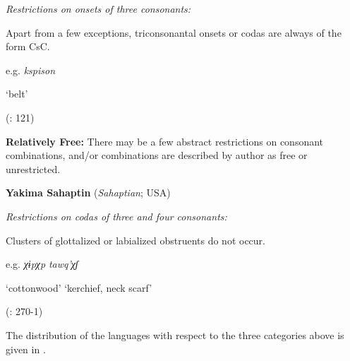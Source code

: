 \textit{Restrictions on onsets of three consonants:}

Apart from a few exceptions, triconsonantal onsets or codas are always of the form CsC.

e.g.  \textit{kspison}

    ‘belt’

(\citealt{LeSourd1993}: 121)
\z
\z

\ea\label{ex:3.29}
  \textbf{Relatively Free:} There may be a few abstract restrictions on consonant combinations, and/or combinations are described by author as free or unrestricted.


\ea
\textbf{Yakima Sahaptin} (\textit{Sahaptian}; USA)

\textit{Restrictions on codas of three and four consonants:}

Clusters of glottalized or labialized obstruents do not occur.

e.g.   \textit{χɨpχp}        \textit{tawq’χʃ}

    ‘cottonwood’      ‘kerchief, neck scarf’

(\citealt{HargusBeavert2002}: 270-1)
\z
\z

  The distribution of the languages with respect to the three categories above is given in .

